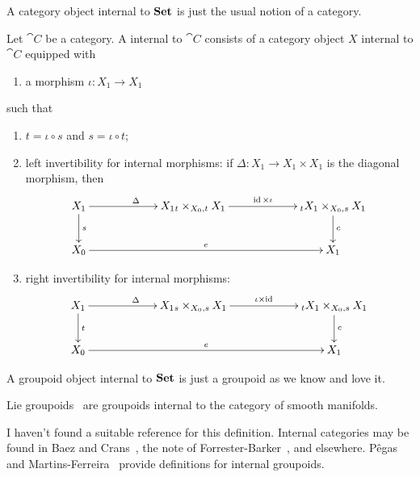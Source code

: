\begin{node}
\begin{definition}
\begin{node}[Examples]\label{internal-0001}%
A category object internal to $\mathbf{Set}$ is just the usual notion of a category.
\end{node}
\end{definition}

\begin{definition}\label{internal-0002}%
Let $\cat{C}$ be a category. A  internal to
$\cat{C}$ consists of a category object $X$ internal to $\cat{C}$
equipped with
\begin{enumerate}
\item a morphism $\iota\colon X_{1}\to X_{1}$
\end{enumerate}
such that
\begin{enumerate}
\item $t=\iota\circ s$ and $s=\iota\circ t$;
\item left invertibility for internal morphisms: if $\Delta\colon X_{1}\to X_{1}\times X_{1}$ is the diagonal
  morphism, then
\[\xymatrixcolsep{5pc} \xymatrix{
  X_{1} \ar[d]^{s} \ar[r]^{\Delta} & X_{1}{}_{t}\times_{X_{0},t}X_{1} \ar[r]^{\id\times\iota}&\ar[d]^{c}{}_{t}X_{1}\times_{X_{0},s}X_{1}\\
X_{0} \ar[rr]^{e} & & X_{1}} \]
\item right invertibility for internal morphisms:
\[\xymatrixcolsep{5pc} \xymatrix{
  X_{1} \ar[d]^{t} \ar[r]^{\Delta} & X_{1}{}_{s}\times_{X_{0},s}X_{1} \ar[r]^{\iota\times\id}&\ar[d]^{c}{}_{t}X_{1}\times_{X_{0},s}X_{1}\\
X_{0} \ar[rr]^{e} & & X_{1}} \]
\end{enumerate}

\begin{node}[Example]\label{internal-0005}%
A groupoid object internal to $\mathbf{Set}$ is just a groupoid as we know and
love it.
\end{node}
\begin{node}[Example]\label{internal-0006}%
Lie groupoids~ are groupoids internal to the category of
smooth manifolds.
\end{node}
\end{definition}

\begin{node}[References]\label{internal-0003}%
I haven't found a suitable reference for this definition. Internal
categories may be found in Baez and Crans~\cite[\S2]{baez2010higherdimensional},
the note of Forrester-Barker~\cite{forresterbarker2002group}, and elsewhere.
P\^{e}gas~\cite{pegas2013groupoids} and
Martins-Ferreira~\cite{martinsferreira2022internal} provide definitions
for internal groupoids.
\end{node}
\end{node}
